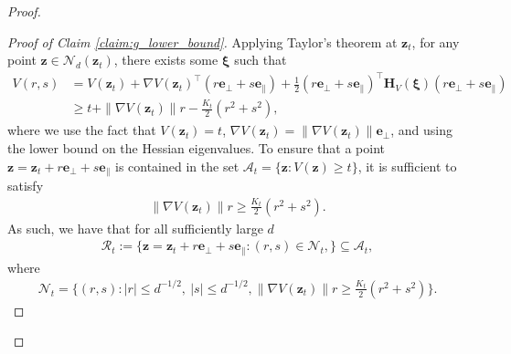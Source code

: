 \documentclass[12pt]{article}
\theoremstyle{definition}
\theoremstyle{remark}
\begin{document}
\begin{proof}
\begin{proof}[Proof of Claim \ref{claim:g_lower_bound}]
Applying Taylor's theorem at $\mathbf{z}_t$, for any point $\mathbf{z} \in \mathcal{N}_d(\mathbf{z}_t)$, there exists some $\boldsymbol{\xi}$ such that
\begin{align*}
    V(r, s) &= V(\mathbf{z}_t) + \nabla V(\mathbf{z}_t)^\top (r \mathbf{e}_{\perp} + s \mathbf{e}_{\parallel}) + \frac{1}{2} (r \mathbf{e}_{\perp} + s \mathbf{e}_{\parallel})^\top \mathbf{H}_V(\boldsymbol{\xi}) (r \mathbf{e}_{\perp} + s \mathbf{e}_{\parallel})\\
    &\geq t + \|\nabla V(\mathbf{z}_t)\| r - \frac{K_t}{2}(r^2 + s^2),
\end{align*}
where we use the fact that $V(\mathbf{z}_t) = t$, $\nabla V(\mathbf{z}_t) = \|\nabla V(\mathbf{z}_t)\| \mathbf{e}_{\perp}$, and using the lower bound on the Hessian eigenvalues. To ensure that a point $\mathbf{z} = \mathbf{z}_t + r \mathbf{e}_{\perp} + s \mathbf{e}_{\parallel}$ is contained in the  set $\mathcal{A}_t = \{ \mathbf{z} : V(\mathbf{z}) \geq t \}$, it is sufficient to satisfy
\begin{align*}
    \|\nabla V(\mathbf{z}_t)\| r \geq \frac{K_t}{2}(r^2 + s^2).
\end{align*}
As such, we have that for all sufficiently large $d$
\begin{align*}
    \mathcal{R}_t := \Big\{ \mathbf{z} = \mathbf{z}_t + r \mathbf{e}_{\perp} + s \mathbf{e}_{\parallel} : (r,s) \in \mathcal{N}_t,  \Big\}  \subseteq \mathcal{A}_t,
\end{align*}
where
\begin{align*}
    \mathcal{N}_t = \Big\{ (r,s) : |r| \leq d^{-1/2}, \ |s| \leq d^{-1/2}, \|\nabla V(\mathbf{z}_t)\| r \geq \frac{K_t}{2}(r^2 + s^2) \Big\}.
\end{align*}


\end{proof}
\end{proof}
\end{document}
